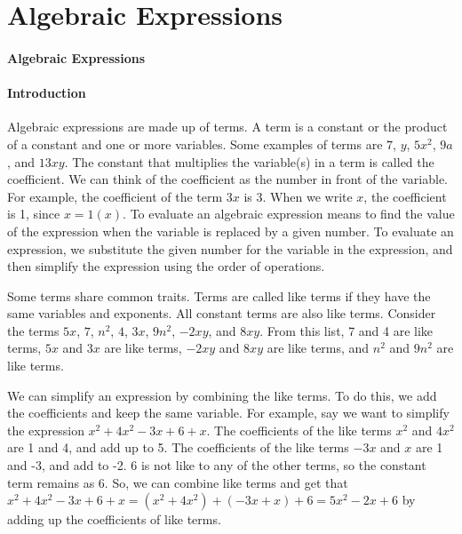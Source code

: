 \section{Algebraic Expressions}
\label{sec:algebraic-expressions}

\paragraph{Algebraic Expressions}



\paragraph{Introduction}



Algebraic expressions are made up of terms. A term is a constant or the product of a constant and one or more variables. Some examples of terms are $7$, $y$, $5x^2$, $9a$, and $13xy$. The constant that multiplies the variable(s) in a term is called the coefficient. We can think of the coefficient as the number in front of the variable. For example, the coefficient of the term $3x$ is 3. When we write $x$, the coefficient is 1, since $x = 1(x)$. To evaluate an algebraic expression means to find the value of the expression when the variable is replaced by a given number. To evaluate an expression, we substitute the given number for the variable in the expression, and then simplify the expression using the order of operations.



Some terms share common traits. Terms are called like terms if they have the same variables and exponents. All constant terms are also like terms. Consider the terms $5x$, $7$, $n^2$, $4$, $3x$, $9n^2$, $-2xy$, and $8xy$. From this list, 7 and 4 are like terms, $5x$ and $3x$ are like terms, $-2xy$ and $8xy$ are like terms, and $n^2$ and $9n^2$ are like terms.



We can simplify an expression by combining the like terms. To do this, we add the coefficients and keep the same variable. For example, say we want to simplify the expression $x^2 + 4x^2 - 3x + 6 + x$. The coefficients of the like terms $x^2$ and $4x^2$ are 1 and 4, and add up to 5. The coefficients of the like terms $-3x$ and $x$ are 1 and -3, and add to -2. 6 is not like to any of the other terms, so the constant term remains as 6. So, we can combine like terms and get that $x^2 + 4x^2 - 3x + 6 + x = (x^2 + 4x^2) + (-3x + x) + 6 = 5x^2 - 2x + 6$ by adding up the coefficients of like terms.



